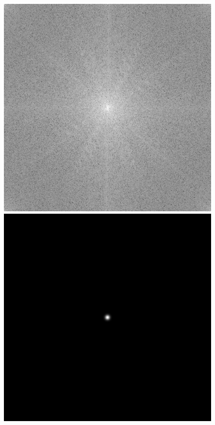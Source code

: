 \documentclass[twoside,twocolumn]{article}
\begin{document}
\begin{figure}[H]
\begin{center}
	\includegraphics[scale=.19]{figures/butterfly_mag_spec_4.png}
	\includegraphics[scale=.19]{figures/butterfly_gau_filter_4.png}

\end{center}
\end{figure}
\end{document}
